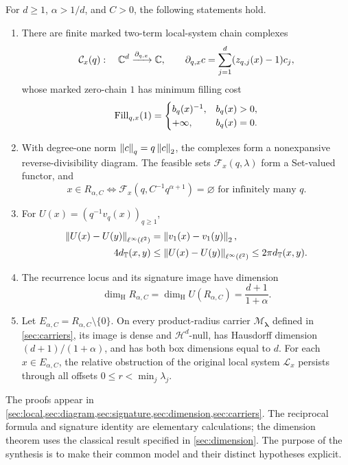 \documentclass[11pt,a4paper]{article}
\begin{document}
\begin{theorem}
\label{thm:main}
For $d\geq1$, $\alpha>1/d$, and $C>0$, the following statements hold.
\begin{enumerate}
 \item There are finite marked two-term local-system chain complexes
 \[
  \mathcal C_x(q):\quad
  \mathbb C^d\xrightarrow{\partial_{q,x}}\mathbb C,
  \qquad \partial_{q,x}c=\sum_{j=1}^d(z_{q,j}(x)-1)c_j,
 \]
 whose marked zero-chain $1$ has minimum filling cost
 \[
  \operatorname{Fill}_{q,x}(1)=
  \begin{cases}b_q(x)^{-1},&b_q(x)>0,\\+\infty,&b_q(x)=0.\end{cases}
 \]
 \item With degree-one norm $\left\lVert c\right\rVert_q=q\left\lVert c\right\rVert_2$, the complexes
 form a nonexpansive reverse-divisibility diagram.  The feasible sets
 $\mathcal F_x(q,\lambda)$ form a Set-valued functor, and
 \[
  x\in R_{\alpha,C}
  \iff \mathcal F_x(q,C^{-1}q^{\alpha+1})=\varnothing
                     \text{ for infinitely many }q.
 \]
 \item For $U(x)=(q^{-1}v_q(x))_{q\geq1}$,
 \begin{align*}
  \left\lVert U(x)-U(y)\right\rVert_{\ell^\infty(\ell^2)}
    &=\left\lVert v_1(x)-v_1(y)\right\rVert_2,\\
  4d_{\mathbb T}(x,y)&\leq\left\lVert U(x)-U(y)\right\rVert_{\ell^\infty(\ell^2)}
                  \leq2\pi d_{\mathbb T}(x,y).
 \end{align*}
 \item The recurrence locus and its signature image have dimension
 \[
  \dim_{\mathrm H}R_{\alpha,C}
   =\dim_{\mathrm H}U(R_{\alpha,C})=\frac{d+1}{1+\alpha}.
 \]
 \item Let $E_{\alpha,C}=R_{\alpha,C}\setminus\{0\}$.  On every
 product-radius carrier $\mathcal M_{\boldsymbol\lambda}$ defined in
 \cref{sec:carriers}, its image is dense and $\mathcal H^d$-null, has
 Hausdorff dimension $(d+1)/(1+\alpha)$, and has both box dimensions
 equal to $d$.  For each $x\in E_{\alpha,C}$, the relative obstruction
 of the original local system $\mathcal L_x$ persists through all
 offsets $0\leq r<\min_j\lambda_j$.
\end{enumerate}
\end{theorem}

The proofs appear in \cref{sec:local,sec:diagram,sec:signature,sec:dimension,sec:carriers}.
The reciprocal formula and signature identity are elementary calculations;
the dimension theorem uses the classical result specified in
\cref{sec:dimension}.  The purpose of the synthesis is to make their common
model and their distinct hypotheses explicit.
\end{document}
